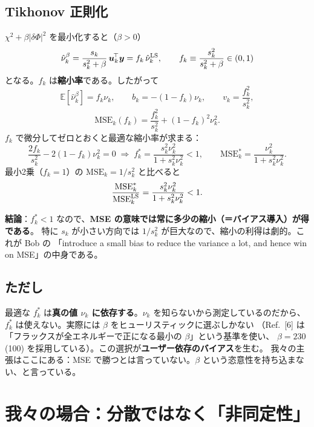 \documentclass[11pt,a4paper]{ltjsarticle}
\newcommand{\dP}{\delta\Phi}
\newcommand{\E}{\mathbb{E}}
\begin{document}
\subsection*{Tikhonov 正則化}
$\chi^2+\beta|\dP|^2$ を最小化すると（$\beta>0$）
\begin{equation}
\hat\nu_k^{\beta}=\frac{s_k}{s_k^2+\beta}\,\bm u_k^{\!\top}\bm y
=f_k\,\hat\nu_k^{\rm LS},\qquad
f_k\equiv\frac{s_k^2}{s_k^2+\beta}\in(0,1)
\end{equation}
となる。$f_k$ は\textbf{縮小率}である。したがって
\begin{equation}
\E[\hat\nu_k^{\beta}]=f_k\nu_k,\qquad
b_k=-(1-f_k)\nu_k,\qquad
v_k=\frac{f_k^2}{s_k^2},
\end{equation}
\begin{equation}
\mathrm{MSE}_k(f_k)=\frac{f_k^{2}}{s_k^{2}}+(1-f_k)^{2}\nu_k^{2}.
\end{equation}
$f_k$ で微分してゼロとおくと最適な縮小率が求まる：
\begin{equation}
\frac{2f_k}{s_k^2}-2(1-f_k)\nu_k^2=0
\;\Longrightarrow\;
f_k^{*}=\frac{s_k^{2}\nu_k^{2}}{1+s_k^{2}\nu_k^{2}}<1,
\qquad
\mathrm{MSE}_k^{*}=\frac{\nu_k^{2}}{1+s_k^{2}\nu_k^{2}}.
\end{equation}
最小2乗（$f_k=1$）の $\mathrm{MSE}_k=1/s_k^2$ と比べると
\begin{equation}
\frac{\mathrm{MSE}_k^{*}}{\mathrm{MSE}_k^{\rm LS}}=\frac{s_k^2\nu_k^2}{1+s_k^2\nu_k^2}<1 .
\end{equation}

\textbf{結論}：$f_k^*<1$ なので、\textbf{MSE の意味では常に多少の縮小（＝バイアス導入）が得である}。
特に $s_k$ が小さい方向では $1/s_k^2$ が巨大なので、縮小の利得は劇的。これが Bob の
「introduce a small bias to reduce the variance a lot, and hence win on MSE」の中身である。

\subsection*{ただし}
最適な $f_k^*$ は\textbf{真の値 $\nu_k$ に依存する}。$\nu_k$ を知らないから測定しているのだから、
$f_k^*$ は使えない。実際には $\beta$ をヒューリスティックに選ぶしかない
（Ref.~[6] は「フラックスが全エネルギーで正になる最小の $\beta$」という基準を使い、
$\beta=230$ (100) を採用している）。この選択が\textbf{ユーザー依存のバイアス}を生む。
我々の主張はここにある：MSE で勝つとは言っていない。$\beta$ という恣意性を持ち込まない、と言っている。

\section{我々の場合：分散ではなく「非同定性」}
\end{document}
